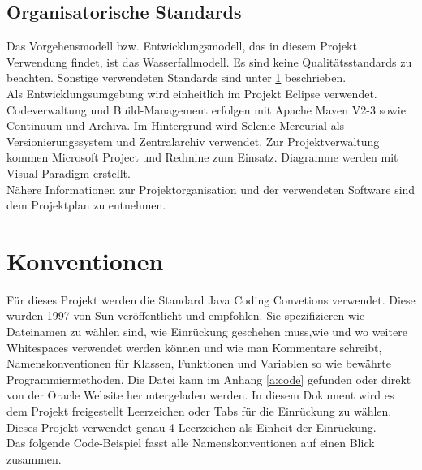 \subsection{Organisatorische Standards}

Das Vorgehensmodell bzw. Entwicklungsmodell, das in diesem Projekt Verwendung
findet, ist das Wasserfallmodell. Es sind keine Qualitätsstandards zu beachten.
Sonstige verwendeten Standards sind unter \ref{sec:2:konv} beschrieben.
\\
Als Entwicklungsumgebung wird einheitlich im Projekt Eclipse verwendet.
Codeverwaltung und Build-Management erfolgen mit Apache Maven V2-3 sowie
Continuum und Archiva. Im Hintergrund wird Selenic Mercurial als
Versionierungssystem und Zentralarchiv verwendet. Zur Projektverwaltung kommen
Microsoft Project und Redmine zum Einsatz. Diagramme werden mit Visual Paradigm erstellt.\\ Nähere Informationen zur Projektorganisation und der verwendeten Software sind dem Projektplan zu entnehmen.


\section{Konventionen}
\label{sec:2:konv}

Für dieses Projekt werden die Standard Java Coding Convetions verwendet.
Diese wurden 1997 von Sun veröffentlicht und empfohlen. Sie spezifizieren
wie Dateinamen zu wählen sind, wie Einrückung geschehen muss,wie und wo
weitere Whitespaces verwendet werden können und wie man Kommentare schreibt, 
Namenskonventionen für Klassen, Funktionen und Variablen so wie bewährte Programmiermethoden. Die Datei kann im Anhang \ref{a:code} gefunden oder direkt von der Oracle Website
heruntergeladen werden. In diesem Dokument wird es dem Projekt freigestellt Leerzeichen oder Tabs für die
Einrückung zu wählen. Dieses Projekt verwendet genau 4 Leerzeichen als Einheit der Einrückung.
\\
\clearpage
Das folgende Code-Beispiel fasst alle Namenskonventionen auf einen Blick
zusammen.



